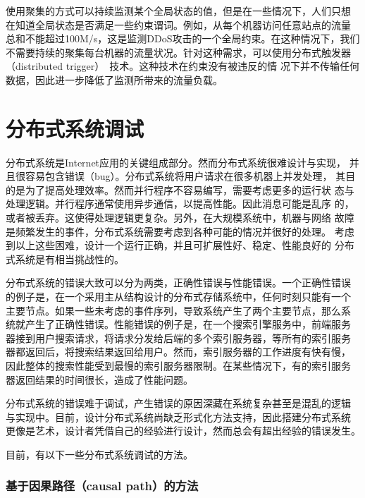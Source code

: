 使用聚集的方式可以持续监测某个全局状态的值，但是在一些情况下，人们只想
在知道全局状态是否满足一些约束谓词。例如，从每个机器访问任意站点的流量
总和不能超过100M/s，这是监测DDoS攻击的一个全局约束。在这种情况下，我们
不需要持续的聚集每台机器的流量状况。针对这种需求，可以使用分布式触发器
（distributed trigger）~\cite{Jain2004, Huang2006, Keralapura2006,
Sharfman2007, Cormode2005, Das2004}技术。这种技术在约束没有被违反的情
况下并不传输任何数据，因此进一步降低了监测所带来的流量负载。

\section{分布式系统调试}
\label{sec:intro_debugging}

分布式系统是Internet应用的关键组成部分。然而分布式系统很难设计与实现，
并且很容易包含错误（bug）。分布式系统将用户请求在很多机器上并发处理，
其目的是为了提高处理效率。然而并行程序不容易编写，需要考虑更多的运行状
态与处理逻辑。并行程序通常使用异步通信，以提高性能。因此消息可能是乱序
的，或者被丢弃。这使得处理逻辑更复杂。另外，在大规模系统中，机器与网络
故障是频繁发生的事件，分布式系统需要考虑到各种可能的情况并很好的处理。
考虑到以上这些困难，设计一个运行正确，并且可扩展性好、稳定、性能良好的
分布式系统是有相当挑战性的。

分布式系统的错误大致可以分为两类，正确性错误与性能错误。一个正确性错误
的例子是，在一个采用主从结构设计的分布式存储系统中，任何时刻只能有一个
主要节点。如果一些未考虑的事件序列，导致系统产生了两个主要节点，那么系
统就产生了正确性错误。性能错误的例子是，在一个搜索引擎服务中，前端服务
器接到用户搜索请求，将请求分发给后端的多个索引服务器，等所有的索引服务
器都返回后，将搜索结果返回给用户。然而，索引服务器的工作进度有快有慢，
因此整体的搜索性能受到最慢的索引服务器限制。在某些情况下，有的索引服务
器返回结果的时间很长，造成了性能问题。

分布式系统的错误难于调试，产生错误的原因深藏在系统复杂甚至是混乱的逻辑
与实现中。目前，设计分布式系统尚缺乏形式化方法支持，因此搭建分布式系统
更像是艺术，设计者凭借自己的经验进行设计，然而总会有超出经验的错误发生。


目前，有以下一些分布式系统调试的方法。

\subsubsection*{基于因果路径（causal path）的方法}

